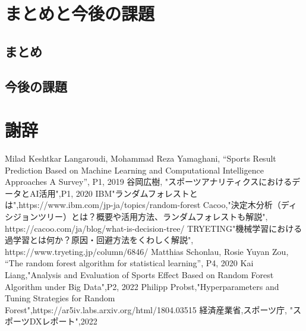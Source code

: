 \documentclass[platex]{suribt}
\begin{document}
\chapter{まとめと今後の課題}
\section{まとめ}
\section{今後の課題}

\backmatter%
\chapter{謝辞}%

\begin{thebibliography}{2}%
\bibitem{}
Milad Keshtkar Langaroudi, Mohammad Reza Yamaghani, “Sports Result Prediction Based on Machine Learning and Computational Intelligence Approaches A Survey”, P1, 2019
\bibitem{}
谷岡広樹, "スポーツアナリティクスにおけるデータとAI活用",P1, 2020
\bibitem{}
IBM"ランダムフォレストとは",https://www.ibm.com/jp-ja/topics/random-forest
\bibitem{}
Cacoo,"決定木分析（ディシジョンツリー）とは？概要や活用方法、ランダムフォレストも解説", https://cacoo.com/ja/blog/what-is-decision-tree/
\bibitem{}
TRYETING"機械学習における過学習とは何か？原因・回避方法をくわしく解説", https://www.tryeting.jp/column/6846/
\bibitem{}
Matthias Schonlau, Rosie Yuyan Zou, “The random forest algorithm for statistical learning”, P4, 2020
\bibitem{}
Kai Liang,"Analysis and Evaluation of Sports Effect Based on Random Forest Algorithm under Big Data",P2, 2022
\bibitem{}
Philipp Probst,"Hyperparameters and Tuning Strategies for Random Forest",https://ar5iv.labs.arxiv.org/html/1804.03515
\bibitem{}
経済産業省,スポーツ庁, "スポーツDXレポート",2022


\end{thebibliography}
\appendix%
\chapter{}
\end{document}
